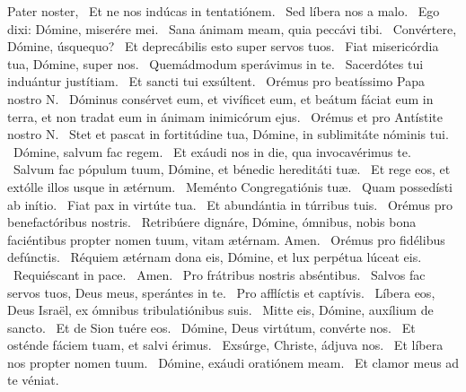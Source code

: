 Pater noster,  \V\ Et ne nos indúcas in tentatiónem. \R\ Sed líbera nos a malo. \V\ Ego dixi: Dómine, miserére mei. \R\ Sana ánimam meam, quia peccávi tibi. \V\ Convértere, Dómine, úsquequo? \R\ Et deprecábilis esto super servos tuos. \V\ Fiat misericórdia tua, Dómine, super nos. \R\ Quemádmodum sperávimus in te. \V\ Sacerdótes tui induántur justítiam. \R\ Et sancti tui exsúltent. \V\ Orémus pro beatíssimo Papa nostro N. \R\ Dóminus consérvet eum, et vivíficet eum, et beátum fáciat eum in terra, et non tradat eum in ánimam inimicórum ejus. \V\ Orémus et pro Antístite nostro N. \R\ Stet et pascat in fortitúdine tua, Dómine, in sublimitáte nóminis tui. \V\ Dómine, salvum fac regem. \R\ Et exáudi nos in die, qua invocavérimus te. \V\ Salvum fac pópulum tuum, Dómine, et bénedic hereditáti tuæ. \R\ Et rege eos, et extólle illos usque in ætérnum. \V\ Meménto Congregatiónis tuæ. \R\ Quam possedísti ab inítio. \V\ Fiat pax in virtúte tua. \R\ Et abundántia in túrribus tuis. \V\ Orémus pro benefactóribus nostris. \R\ Retribúere dignáre, Dómine, ómnibus, nobis bona faciéntibus propter nomen tuum, vitam ætérnam. Amen. \V\ Orémus pro fidélibus defúnctis. \R\ Réquiem ætérnam dona eis, Dómine, et lux perpétua lúceat eis. \V\ Requiéscant in pace. \R\ Amen. \V\ Pro frátribus nostris abséntibus. \R\ Salvos fac servos tuos, Deus meus, sperántes in te. \V\ Pro afflíctis et captívis. \R\ Líbera eos, Deus Israël, ex ómnibus tribulatiónibus suis. \V\ Mitte eis, Dómine, auxílium de sancto. \R\ Et de Sion tuére eos. \V\ Dómine, Deus virtútum, convérte nos. \R\ Et osténde fáciem tuam, et salvi érimus. \V\ Exsúrge, Christe, ádjuva nos. \R\ Et líbera nos propter nomen tuum. \V\ Dómine, exáudi oratiónem meam. \R\ Et clamor meus ad te véniat.



